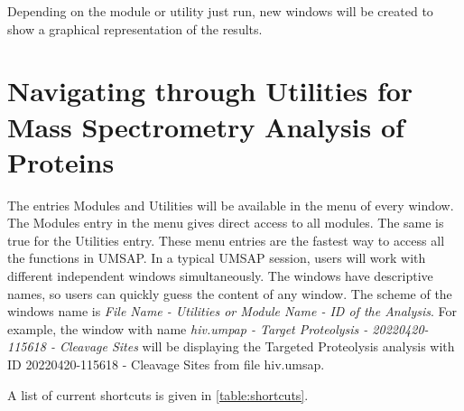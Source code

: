 Depending on the module or utility just run, new windows will be created to show a
graphical representation of the results.

\section{Navigating through Utilities for Mass Spectrometry Analysis of Proteins}

The entries Modules and Utilities will be available in the menu of every window.
The Modules entry in the menu gives direct access to all modules. The same is true for
the Utilities entry. These menu entries are the fastest way to access all the functions
in UMSAP. In a typical UMSAP session, users will work with different independent windows
simultaneously. The windows have descriptive names, so users can quickly guess the content
of any window. The scheme of the windows name is
\textit{File Name - Utilities or Module Name - ID of the Analysis}. For example, the window
with name \textit{hiv.umpap - Target Proteolysis - 20220420-115618 - Cleavage Sites} will be
displaying the Targeted Proteolysis analysis with ID 20220420-115618 - Cleavage Sites from
file hiv.umsap.

A list of current shortcuts is given in \autoref{table:shortcuts}.

